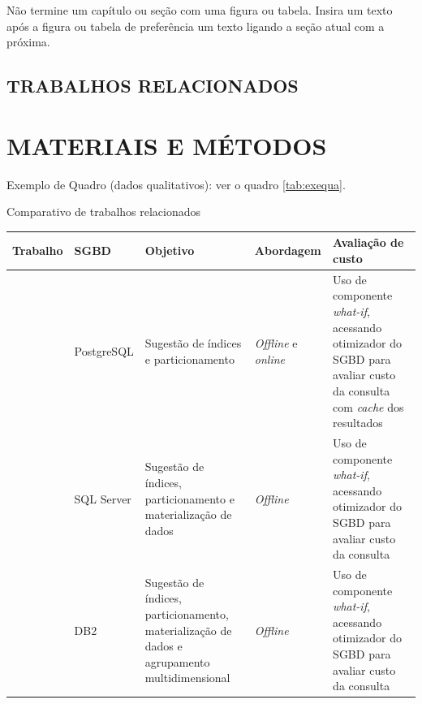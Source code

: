 \documentclass[
    12pt,				       %
    openright,			       %
    oneside,			       %
    a4paper,			       %
    chapter=TITLE,             %
    sumario=tradicional,       %
    english,			        %
    brazil, 				    %
 ]{abntex2}
\begin{document}
Não termine um capítulo ou seção com uma figura ou tabela. Insira um texto após a figura ou tabela de preferência um texto ligando a seção atual com a próxima.

\section{\MakeUppercase{Trabalhos Relacionados}}\label{sec:TrabRel}


\chapter{\MakeUppercase{Materiais e Métodos}}\label{sec:metodos}

Exemplo de Quadro (dados qualitativos): ver o quadro \autoref{tab:exequa}.

\begin{quadro}[!ht]
    \centering
    \caption{Comparativo de trabalhos relacionados}
    \begin{tabular}{|p{2.1cm}|l|p{4.1cm}|p{2.1cm}|p{3.1cm}|} \hline
        \textbf{Trabalho}
        & \textbf{SGBD}
        & \textbf{Objetivo}
        & \textbf{Abordagem}
        & \textbf{Avaliação de custo}
        \\ \hline
        \cite{Alagiannis:2010}
        & PostgreSQL
        & Sugestão de índices e particionamento
        & \emph{Offline} e \emph{online}
        & Uso de componente \emph{what-if}, acessando otimizador do SGBD para avaliar custo da consulta com \emph{cache} dos resultados
        \\ \hline
        \cite{Agrawal:2004}
        & SQL Server
        & Sugestão de índices, particionamento e materialização de dados
        & \emph{Offline}
        & Uso de componente \emph{what-if}, acessando otimizador do SGBD para avaliar custo da consulta
        \\ \hline
        \cite{Zilio:2004}
        & DB2
        & Sugestão de índices, particionamento, materialização de dados e agrupamento multidimensional
        & \emph{Offline}
        & Uso de componente \emph{what-if}, acessando otimizador do SGBD para avaliar custo da consulta
        \\ \hline
    \end{tabular}
    \label{tab:exequa}
\end{quadro}
\end{document}
